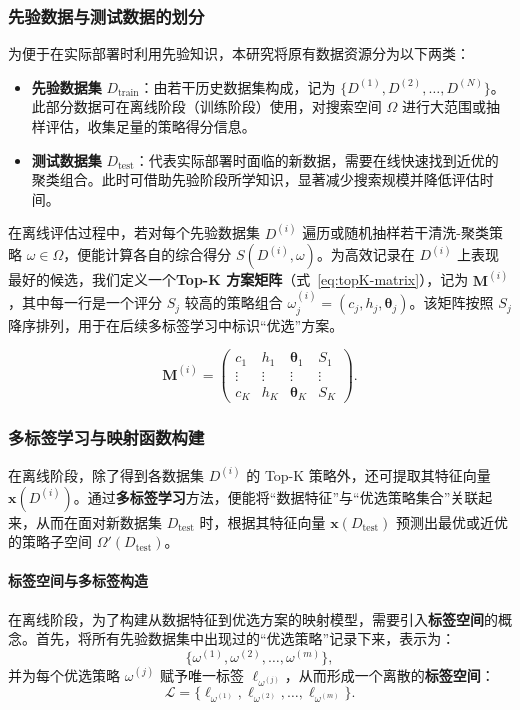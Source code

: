 \documentclass[8pt]{article} %
\numberwithin{equation}{section}
\begin{document}
\subsubsection{先验数据与测试数据的划分}
\label{subsec:dataset-split}

为便于在实际部署时利用先验知识，本研究将原有数据资源分为以下两类：
\begin{itemize}
    \item \textbf{先验数据集} $D_{\text{train}}$：由若干历史数据集构成，记为 $\{D^{(1)}, D^{(2)}, \dots, D^{(N)}\}$。此部分数据可在离线阶段（训练阶段）使用，对搜索空间 $\Omega$ 进行大范围或抽样评估，收集足量的策略得分信息。
    \item \textbf{测试数据集} $D_{\text{test}}$：代表实际部署时面临的新数据，需要在线快速找到近优的聚类组合。此时可借助先验阶段所学知识，显著减少搜索规模并降低评估时间。
\end{itemize}

在离线评估过程中，若对每个先验数据集 $D^{(i)}$ 遍历或随机抽样若干清洗-聚类策略 $\omega \in \Omega$，便能计算各自的综合得分 $S(D^{(i)}, \omega)$。为高效记录在 $D^{(i)}$ 上表现最好的候选，我们定义一个\textbf{Top-K 方案矩阵}（式~\eqref{eq:topK-matrix}），记为 $\mathbf{M}^{(i)}$，其中每一行是一个评分 $S_j$ 较高的策略组合 $\omega_j^{(i)}=(c_j,h_j,\boldsymbol{\theta}_j)$。该矩阵按照 $S_j$ 降序排列，用于在后续多标签学习中标识“优选”方案。

\begin{equation}\label{eq:topK-matrix}
\mathbf{M}^{(i)} 
= 
\begin{pmatrix}
c_1 & h_1 & \boldsymbol{\theta}_1 & S_1 \\
\vdots & \vdots & \vdots & \vdots \\
c_K & h_K & \boldsymbol{\theta}_K & S_K
\end{pmatrix}.
\end{equation}

\subsubsection{多标签学习与映射函数构建}
\label{subsec:multi-label}

在离线阶段，除了得到各数据集 $D^{(i)}$ 的 Top-K 策略外，还可提取其特征向量 $\mathbf{x}(D^{(i)})$。通过\textbf{多标签学习}方法，便能将“数据特征”与“优选策略集合”关联起来，从而在面对新数据集 $D_{\text{test}}$ 时，根据其特征向量 $\mathbf{x}(D_{\text{test}})$ 预测出最优或近优的策略子空间 $\Omega'(D_{\text{test}})$。

\paragraph{标签空间与多标签构造}  
在离线阶段，为了构建从数据特征到优选方案的映射模型，需要引入\textbf{标签空间}的概念。首先，将所有先验数据集中出现过的“优选策略”记录下来，表示为：
\[
\{\omega^{(1)}, \omega^{(2)}, \ldots, \omega^{(m)}\},
\]
并为每个优选策略 $\omega^{(j)}$ 赋予唯一标签 $\ell_{\omega^{(j)}}$，从而形成一个离散的\textbf{标签空间}：
\begin{equation}\label{eq:label-space}
\mathcal{L}
= \{\ell_{\omega^{(1)}}, \ell_{\omega^{(2)}}, \ldots, \ell_{\omega^{(m)}}\}.
\end{equation}
\end{document}
